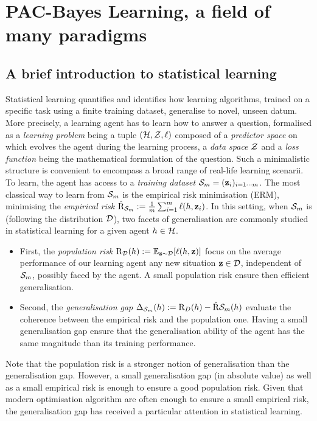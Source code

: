 \chapter[PAC-Bayes Learning, a field of many paradigms]{PAC-Bayes Learning, a field of many paradigms}
\label{chap:intro-pac-bayes}

\minitoc

\addchapterlof
\addchapterloa
\addchapterloe

\section{A brief introduction to statistical learning}
\label{sec: intro-stat-learning}
Statistical learning \citep{vapnik1999overview,james2013introduction} quantifies and identifies how learning algorithms, trained on a specific task using a finite training dataset, generalise to novel, unseen datum. More precisely, a learning agent has to learn how to answer a question, formalised as a \emph{learning problem} being a tuple $(\H,\Z,\ell)$ composed of a \emph{predictor space} on which evolves the agent during the learning process, a \emph{data space} $\Z$ and a \emph{loss function} being the mathematical formulation of the question. Such a minimalistic structure is convenient to encompass a broad range of real-life learning scenarii. To learn, the agent has access to a \emph{training dataset} $\S_m= (\z_i)_{i=1\cdots m}$. The most classical way to learn from $\Sm$ is the empirical risk minimisation (ERM), minimising the \emph{empirical risk} $\Riskhat_{\Sm}:= \frac{1}{m} \sum_{i=1}^m \ell(h,\z_i)$. In this setting, when $\S_m$ is \iid (following the distribution $\D$), two facets of generalisation are commonly studied in statistical learning for a given agent $h\in\H$.

\begin{itemize}
    \item First, the \emph{population risk} $\Risk_\D(h):= \mathbb{E}_{\z\sim\D}[\ell(h,\z)]$ focus on the average performance of our learning agent \wrt any new situation $\z\in\D$, independent of $\S_m$, possibly faced by the agent. A small population risk ensure then efficient generalisation.   
    \item Second, the \emph{generalisation gap}  $\Delta_{\Sm}(h):= \Risk_D(h) - \Riskhat{\Sm}(h)$ evaluate the coherence between the empirical risk and the population one. Having a small generalisation gap ensure that the generalisation ability of the agent has the same magnitude than its training performance. 
\end{itemize}
Note that the population risk is a stronger notion of generalisation than the generalisation gap. However, a small generalisation gap (in absolute value) as well as a small empirical risk is enough to ensure a good population risk. Given that modern optimisation algorithm are often enough to ensure a small empirical risk, the generalisation gap has received a particular attention in statistical learning. 

